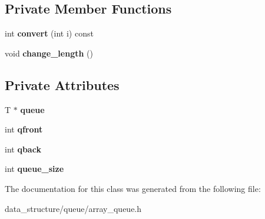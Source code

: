 \subsection*{Private Member Functions}
\begin{DoxyCompactItemize}
\item 
\mbox{\label{classArrayQueue_ab7696081f60af4fe1aab9c607c0c6c5e}} 
int {\bfseries convert} (int i) const
\item 
\mbox{\label{classArrayQueue_a965b1f57a75434cd6bbfeb6ef792a999}} 
void {\bfseries change\+\_\+length} ()
\end{DoxyCompactItemize}
\subsection*{Private Attributes}
\begin{DoxyCompactItemize}
\item 
\mbox{\label{classArrayQueue_a1fcffdd9b49b218176a4abcb79fbf210}} 
T $\ast$ {\bfseries queue}
\item 
\mbox{\label{classArrayQueue_a2b8c600fa5f0d1f7d427de65c89c30e2}} 
int {\bfseries qfront}
\item 
\mbox{\label{classArrayQueue_a579a67f77e917054484beb9e4b0d70ee}} 
int {\bfseries qback}
\item 
\mbox{\label{classArrayQueue_afaedf9018ab60ddfc5cbe6f8334a33cd}} 
int {\bfseries queue\+\_\+size}
\end{DoxyCompactItemize}


The documentation for this class was generated from the following file\+:\begin{DoxyCompactItemize}
\item 
data\+\_\+structure/queue/array\+\_\+queue.\+h\end{DoxyCompactItemize}
